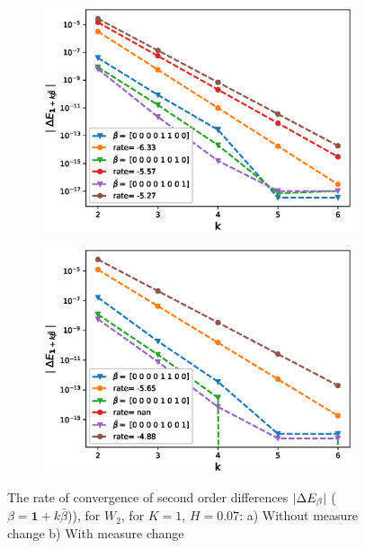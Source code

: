 \documentclass[11pt]{article}
\begin{document}
\begin{figure}[h!]
	\centering
	\begin{subfigure}{.45\textwidth}
		\centering
		\includegraphics[width=1\linewidth]{./figures/rBergomi_mixed_error_rates/without_change_measure/N_4/H_007/mixed_difference_order2_rbergomi_4steps_H_007_K_1_totally_hierarch_with_rate_W2}
		\caption{}
		\label{fig:sub3}
	\end{subfigure}%
	\begin{subfigure}{.45\textwidth}
		\centering
		\includegraphics[width=1\linewidth]{./figures/rBergomi_mixed_error_rates/partial_change_measure/N_4/H_007/mixed_difference_order2_rbergomi_4steps_H_007_K_1_totally_hierarch_with_rate_W2_change_measure_part_spec}
		\caption{}
		\label{fig:sub4}
	\end{subfigure}
	
	\caption{The rate of convergence of  second order differences $\left\lvert\Delta E_{\beta}\right\rvert$ ($\beta=\mathbf{1}+k \bar{\beta}$)), for $W_2$, for $K=1$, $H=0.07$: a) Without measure change b) With measure change}
	\label{fig:second_diff_comp_K_1_H_007_W_2}
\end{figure}
\end{document}
